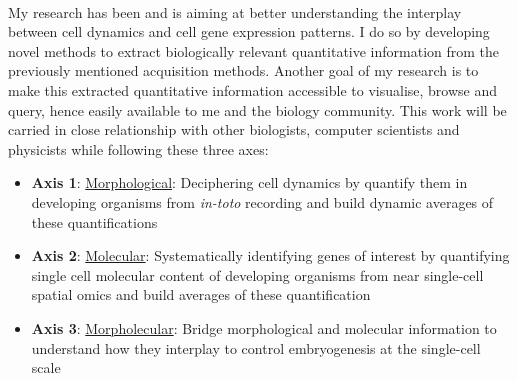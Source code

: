 \paragraph{}My research has been and is aiming at better understanding the interplay between cell dynamics and cell gene expression patterns.
I do so by developing novel methods to extract biologically relevant quantitative information from the previously mentioned acquisition methods.
Another goal of my research is to make this extracted quantitative information accessible to visualise, browse and query, hence easily available to me and the biology community.
This work will be carried in close relationship with other biologists, computer scientists and physicists while following these three axes:
\begin{itemize}
   \item \textbf{Axis 1}: \underline{Morphological}: Deciphering cell dynamics by quantify them in developing organisms from \emph{in-toto} recording and build dynamic averages of these quantifications
   \item \textbf{Axis 2}: \underline{Molecular}: Systematically identifying genes of interest by quantifying single cell molecular content of developing organisms from near single-cell spatial omics and build averages of these quantification
   \item \textbf{Axis 3}: \underline{Morpholecular}: Bridge morphological and molecular information to understand how they interplay to control embryogenesis at the single-cell scale
\end{itemize}
